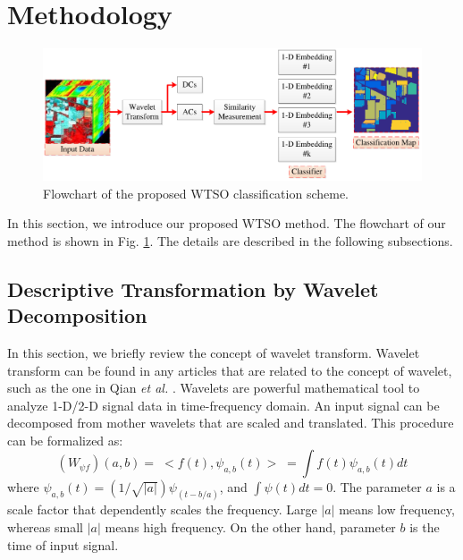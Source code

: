 \documentclass{ws-ijwmip}
\begin{document}
\section{Methodology}\label{sec:proposed}
\begin{figure}[bh]
	\centerline{\includegraphics[width=13cm]{image/flow-chart}}
	\vspace*{8pt}
	\caption{Flowchart of the proposed WTSO classification scheme.}
	\label{figure1}
\end{figure}
In this section, we introduce our proposed  WTSO method. The flowchart of our method is shown in Fig. \ref{figure1}.
The details are described in the following subsections.


\subsection{Descriptive Transformation by Wavelet Decomposition}
In this section, we briefly review the concept of wavelet transform.
Wavelet transform can be found in any articles that are related to the concept of wavelet, such as the one in Qian \textit{et al.} \cite{29}. 
Wavelets are powerful mathematical tool to analyze 1-D/2-D signal data in time-frequency domain.
An input signal can be decomposed from mother wavelets that are scaled and translated. 
This procedure can be formalized as: %
\begin{equation}
(W_{\psi f})(a,b) = \;<f(t),\psi _{a,b} (t)>\; = \int f(t)\psi _{a,b} (t)dt
\label{equ2.1}
\end{equation}
where $\psi_{a,b}(t) = (1/\sqrt{|a|})\psi_{(t-b/{a})}$, and $\int \psi (t)dt=0$. 
The parameter $a$ is a scale factor that dependently scales the frequency.
Large $| a |$ means low frequency, whereas small $| a|$ means high frequency.
On the other hand, parameter $b$ is the time of input signal. 
\end{document}
